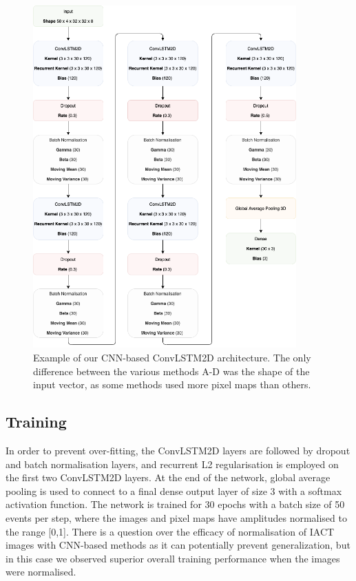 \begin{figure}
  \centering
  \includegraphics[width=0.9\textwidth]{figures/Newfig3.png}
  \caption{Example of our CNN-based ConvLSTM2D architecture. The only difference between the various methods A-D was the shape of the input vector, as some methods used more pixel maps than others.
  }
  \label{fig:model}
\end{figure}
\subsection{Training}
In order to prevent over-fitting, the ConvLSTM2D layers are followed by dropout and batch normalisation layers, and recurrent L2 regularisation \cite{Keras} is employed on the first two ConvLSTM2D layers. At the end of the network, global average pooling is used to connect to a final dense output layer of size 3 with a softmax activation function. The network is trained for 30 epochs with a batch size of 50 events per step, where the images and pixel maps have amplitudes normalised to the range [0,1]. There is a question over the efficacy of normalisation of IACT images with CNN-based methods as it can potentially prevent generalization, but in this case we observed superior overall training performance when the images were normalised.

